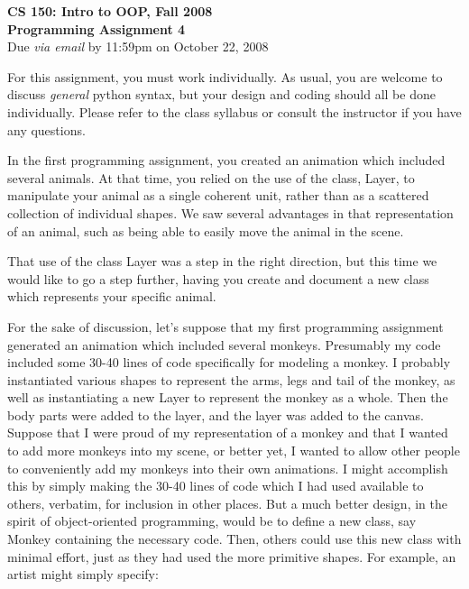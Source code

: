 \documentclass[11pt]{article}
\begin{document}

\begin{center}
\LARGE \textbf{CS 150: Intro to OOP, Fall 2008}
\\
\textbf{Programming Assignment 4}
\\[1ex]
\Large Due \emph{via email} by 11:59pm on October 22, 2008\\

\end{center}

For this assignment, you must work individually.  As usual, you are
welcome to discuss {\em general} python syntax, but your design and
coding should all be done individually.  Please refer to the class
syllabus or consult the instructor if you have any questions.

\bigskip

In the first programming assignment, you created an animation which
included several animals. At that time, you relied on the use of the
class, Layer, to manipulate your animal as a single coherent unit,
rather than as a scattered collection of individual shapes. We saw
several advantages in that representation of an animal, such as
being able to easily move the animal in the scene.

That use of the class Layer was a step in the right direction, but
this time we would like to go a step further, having you create and
document a new class which represents your specific animal.

\bigskip


For the sake of discussion, let's suppose that my first programming
assignment generated an animation which included several monkeys.
Presumably my code included some 30-40 lines of code specifically
for modeling a monkey. I probably instantiated various shapes to
represent the arms, legs and tail of the monkey, as well as
instantiating a new Layer to represent the monkey as a whole. Then
the body parts were added to the layer, and the layer was added to
the canvas. Suppose that I were proud of my representation of a
monkey and that I wanted to add more monkeys into my scene, or
better yet, I wanted to allow other people to conveniently add my
monkeys into their own animations. I might accomplish this by simply
making the 30-40 lines of code which I had used available to others,
verbatim, for inclusion in other places. But a much better design,
in the spirit of object-oriented programming, would be to define a
new class, say Monkey containing the necessary code. Then, others
could use this new class with minimal effort, just as they had used
the more primitive shapes. For example, an artist might simply
specify:
\end{document}

